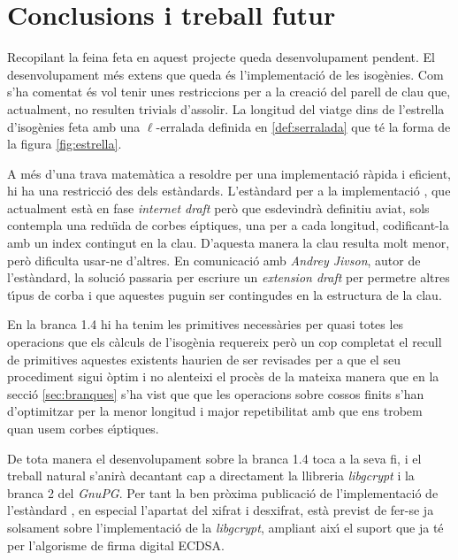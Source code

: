 \documentclass[12pt,twoside,catalan,a4paper]{book}%
\numberwithin{figure}{section}		%
\theoremstyle{definition}   			%
\def\ces{corbes e\lgem{}\'{\i}ptiques}%
\def\cfs{cossos finits}%
\theoremstyle{saltolinea}   			%
\begin{document}
\chapter{Conclusions i treball futur}


Recopilant la feina feta en aquest projecte queda desenvolupament pendent. El desenvolupament m\'es extens que queda \'es l'implementaci\'o de les isog\`enies. Com s'ha comentat \'es vol tenir unes restriccions per a la creaci\'o del parell de clau que, actualment, no resulten trivials d'assolir. La longitud del viatge dins de l'estrella d'isog\`enies feta amb una $\ell$-erralada definida en \ref{def:serralada} que t\'e la forma de la figura \ref{fig:estrella}.

A m\'es d'una trava matem\`atica a resoldre per una implementaci\'o r\`apida i eficient, hi ha una restricci\'o des dels est\`andards. L'est\`andard per a la implementaci\'o \cite{ECPGP}, que actualment est\`a en fase \emph{internet draft} per\`o que esdevindr\`a definitiu aviat, sols contempla una redu\"{\i}da de \ces{}, una per a cada longitud, codificant-la amb un index contingut en la clau. D'aquesta manera la clau resulta molt menor, per\`o dificulta usar-ne d'altres. En comunicaci\'o amb \emph{Andrey Jivson}, autor de l'est\`andard, la soluci\'o passaria per escriure un \emph{extension draft} per permetre altres t\'{\i}pus de corba i que aquestes puguin ser contingudes en la estructura de la clau.

En la branca 1.4 hi ha tenim les primitives necess\`aries per quasi totes les operacions que els c\`alculs de l'isog\`enia requereix per\`o un cop completat el recull de primitives aquestes existents haurien de ser revisades per a que el seu procediment sigui \`optim i no alenteixi el proc\`es de la mateixa manera que en la secci\'o \ref{sec:branques} s'ha vist que que les operacions sobre \cfs{} s'han d'optimitzar per la menor longitud i major repetibilitat amb que ens trobem quan usem \ces{}.

De tota manera el desenvolupament sobre la branca 1.4 toca a la seva fi, i el treball natural s'anir\`a decantant cap a directament la llibreria \emph{libgcrypt} i la branca 2 del \emph{GnuPG}. Per tant la ben pr\`oxima publicaci\'o de l'implementaci\'o de l'est\`andard \cite{ECPGP}, en especial l'apartat del xifrat i desxifrat, est\`a previst de fer-se ja solsament sobre l'implementaci\'o de la \emph{libgcrypt}, ampliant aix\'{\i} el suport que ja t\'e per l'algorisme de firma digital ECDSA.
\end{document}
